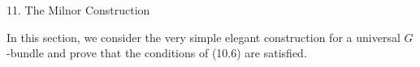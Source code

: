 11. The Milnor Construction

In this section, we consider the very simple elegant construction for a universal $G$-bundle and prove that the conditions of (10.6) are satisfied.
